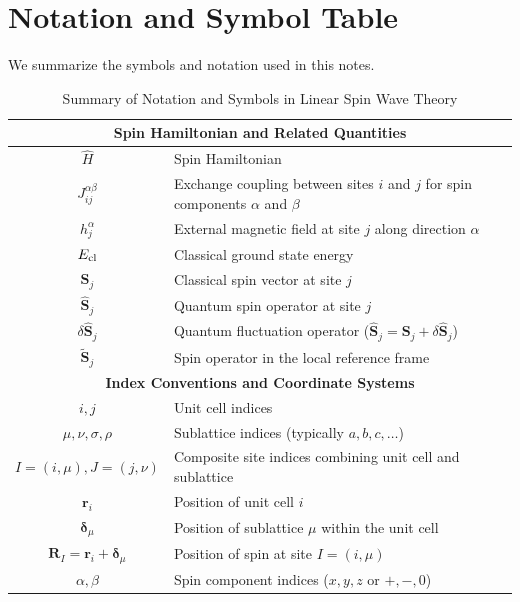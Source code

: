 \documentclass[aps, prx, nofootinbib, superscriptaddress]{revtex4-2}
\begin{document}
\newpage
\appendix

\section{Notation and Symbol Table}\label{app:notation}



We summarize the symbols and notation used in this notes.
\begin{table}[!b]
    \centering
    \caption{Summary of Notation and Symbols in Linear Spin Wave Theory}
    \begin{tabular}{c|l}
    \multicolumn{2}{c}{\textbf{Spin Hamiltonian and Related Quantities}} \\
    \hline
    $\hat{H}$ & Spin Hamiltonian \\
    $J_{ij}^{\alpha\beta}$ & Exchange coupling between sites $i$ and $j$ for spin components $\alpha$ and $\beta$ \\
    $h_j^{\alpha}$ & External magnetic field at site $j$ along direction $\alpha$ \\
    $E_{\rm cl}$ & Classical ground state energy \\
    $\mathbf{S}_j$ & Classical spin vector at site $j$ \\
    $\hat{\mathbf{S}}_j$ & Quantum spin operator at site $j$ \\
    $\delta\hat{\mathbf{S}}_j$ & Quantum fluctuation operator ($\hat{\mathbf{S}}_j = \mathbf{S}_j + \delta\hat{\mathbf{S}}_j$) \\
    $\widetilde{\mathbf{S}}_j$ & Spin operator in the local reference frame \\
    \hline
    \multicolumn{2}{c}{\textbf{Index Conventions and Coordinate Systems}} \\
    \hline
    $i, j$ & Unit cell indices \\
    $\mu, \nu, \sigma, \rho$ & Sublattice indices (typically $a, b, c, \dots$) \\
    $I = (i, \mu), J = (j, \nu)$ & Composite site indices combining unit cell and sublattice \\
    $\mathbf{r}_i$ & Position of unit cell $i$ \\
    $\boldsymbol{\delta}_\mu$ & Position of sublattice $\mu$ within the unit cell \\
    $\mathbf{R}_I = \mathbf{r}_i + \boldsymbol{\delta}_\mu$ & Position of spin at site $I = (i, \mu)$ \\
    $\alpha, \beta$ & Spin component indices ($x, y, z$ or $+, -, 0$) \\

\end{tabular}
\end{table}
\end{document}
